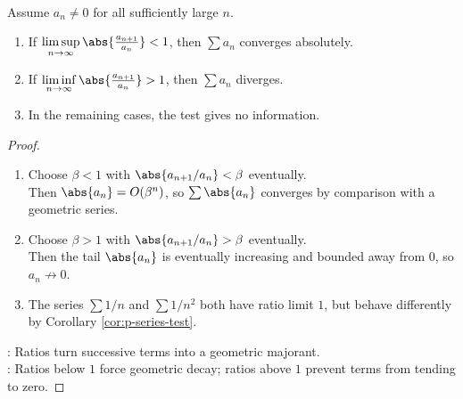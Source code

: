 \begin{theorem} \label{thm:ratio-test} \\
Assume $a_n\neq0$ for all sufficiently large $n$.
\begin{enumerate}[label=(\roman*)]
\setlength{\itemsep}{0pt}
\item If $\limsup\limits_{n\to\infty}\abs{\frac{a_{n+1}}{a_n}}<1$, then $\sum a_n$ converges absolutely.
\item If $\liminf\limits_{n\to\infty}\abs{\frac{a_{n+1}}{a_n}}>1$, then $\sum a_n$ diverges.
\item In the remaining cases, the test gives no information.
\end{enumerate}
\begin{proof}
\begin{enumerate}[label=(\roman*)]
\setlength{\itemsep}{0pt}
\item Choose $\beta<1$ with $\abs{a_{n+1}/a_n}<\beta$ eventually.\\
Then $\abs{a_n}=O(\beta^n)$, so $\sum\abs{a_n}$ converges by comparison with a geometric series.
\item Choose $\beta>1$ with $\abs{a_{n+1}/a_n}>\beta$ eventually.\\
Then the tail $\abs{a_n}$ is eventually increasing and bounded away from $0$, so $a_n\not\to0$.
\item The series $\sum 1/n$ and $\sum 1/n^2$ both have ratio limit $1$, but behave differently by Corollary \ref{cor:p-series-test}.
\end{enumerate}
: Ratios turn successive terms into a geometric majorant.\\
: Ratios below $1$ force geometric decay; ratios above $1$ prevent terms from tending to zero.
\end{proof}
\end{theorem}

